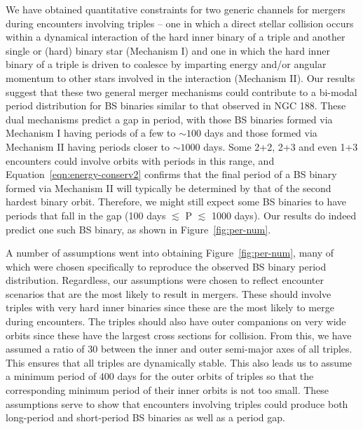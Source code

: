 We have obtained quantitative constraints 
for two generic channels for mergers during encounters involving
triples -- one in which a direct stellar collision occurs within a
dynamical interaction of the hard inner binary of a triple and another
single or (hard) binary star (Mechanism I) and
one in which the hard inner binary of a triple is driven to coalesce
by imparting energy and/or angular momentum to other stars involved in the
interaction (Mechanism II).  Our results
suggest that these two general merger mechanisms could contribute to a
bi-modal period distribution for BS binaries similar to that
observed in NGC 188.  These dual mechanisms predict a gap in
period, with those BS binaries formed via Mechanism I having periods of a
few to $\sim 100$ days and those formed via Mechanism II having
periods closer to $\sim 1000$ days.  Some 2+2, 2+3 and even 1+3
encounters could involve orbits with periods in this range, and
Equation~\ref{eqn:energy-conserv2} confirms that the final period of
a BS binary formed via Mechanism II will typically be determined by
that of the second hardest binary orbit.  Therefore, we might still
expect some BS binaries to have periods that fall in the gap (100 days
$\lesssim$ P $\lesssim$ 1000 days).  Our results do indeed predict one
such BS binary, as shown in Figure~\ref{fig:per-num}.  

A number of assumptions went into obtaining Figure~\ref{fig:per-num},
many of which were chosen specifically to reproduce the observed BS
binary period distribution.  Regardless, our
assumptions were chosen to reflect encounter scenarios that are the
most likely to result in mergers.  These should involve triples with
very hard inner binaries since these are the most likely to merge
during encounters.  The triples should also have outer companions on
very wide orbits since these have the largest cross sections for
collision.  From this, we have assumed a ratio of
30 between the inner and outer semi-major axes of all triples.  This
ensures that all triples are dynamically stable.  This also leads us
to assume a minimum period of $400$ days for the outer
orbits of triples so that the corresponding minimum period of their
inner orbits is not too small.  These assumptions serve to show that
encounters involving 
triples could produce both long-period and short-period BS binaries as
well as a period gap.  

